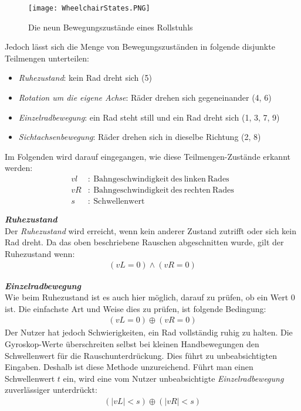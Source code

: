 \begin{figure}[h]
    \centering
    \texttt{[image: WheelchairStates.PNG]}
    \caption{Die neun Bewegungszustände eines Rollstuhls}
    \label{fig:wheelstates}
\end{figure}

Jedoch lässt sich die Menge von Bewegungszuständen in folgende disjunkte Teilmengen unterteilen:
\begin{itemize}
    \item \textit{Ruhezustand}: kein Rad dreht sich (5)
    \item \textit{Rotation um die eigene Achse}: Räder drehen sich gegeneinander (4, 6)
    \item \textit{Einzelradbewegung}: ein Rad steht still und ein Rad dreht sich (1, 3, 7, 9)
    \item \textit{Sichtachsenbewegung}: Räder drehen sich in dieselbe Richtung (2, 8)
\end{itemize}

Im Folgenden wird darauf eingegangen, wie diese Teilmengen-Zustände erkannt werden:
\begin{align}
    vl & :\ \mathrm{Bahngeschwindigkeit\ des\ linken\ Rades}  \\
    vR & :\ \mathrm{Bahngeschwindigkeit\ des\ rechten\ Rades} \\
    s  & :\ \mathrm{Schwellenwert}
\end{align}

\textbf{\textit{Ruhezustand}}\\
Der \textit{Ruhezustand} wird erreicht, wenn kein anderer Zustand zutrifft oder sich kein Rad dreht.
Da das oben beschriebene Rauschen abgeschnitten wurde, gilt der Ruhezustand wenn:
\begin{align}
    (vL = 0) \land (vR = 0)
\end{align}

\textbf{\textit{Einzelradbewegung}}\\
Wie beim Ruhezustand ist es auch hier möglich, darauf zu prüfen, ob ein Wert 0 ist.
Die einfachste Art und Weise dies zu prüfen, ist folgende Bedingung:
\begin{align}
    (vL = 0) \oplus (vR = 0)
\end{align}
Der Nutzer hat jedoch Schwierigkeiten, ein Rad vollständig ruhig zu halten.
Die Gyroskop-Werte überschreiten selbst bei kleinen Handbewegungen den Schwellenwert für die Rauschunterdrückung.
Dies führt zu unbeabsichtigten Eingaben.
Deshalb ist diese Methode unzureichend.
Führt man einen Schwellenwert $t$ ein, wird eine vom Nutzer unbeabsichtigte \textit{Einzelradbewegung} zuverlässiger unterdrückt:
\begin{align}
    (|vL| < s) \oplus (|vR| < s)
\end{align}

